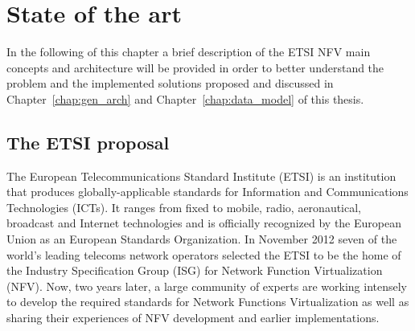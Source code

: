\chapter{State of the art}
\label{chap:the_state_of_the_art}
In the following of this chapter a brief description of the ETSI NFV main concepts and architecture will be provided in order to better understand the problem and the implemented solutions proposed and discussed in Chapter~\ref{chap:gen_arch} and Chapter~\ref{chap:data_model} of this thesis.

\section{The ETSI proposal}
The European Telecommunications Standard Institute (ETSI) is an institution that produces globally-applicable standards for Information and Communications Technologies (ICTs). It ranges from fixed to mobile, radio, aeronautical, broadcast and Internet technologies and is officially recognized by the European Union as an European Standards Organization. In November 2012 seven of the world's leading telecoms network operators selected the ETSI to be the home of the Industry Specification Group (ISG) for Network Function Virtualization (NFV). Now, two years later, a large community of experts are working intensely to develop the required standards for Network Functions Virtualization as well as sharing their experiences of NFV development and earlier implementations.

